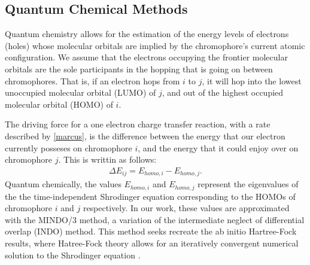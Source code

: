 \subsection{Quantum Chemical Methods}
\label{qccmethods}
Quantum chemistry allows for the estimation of the energy levels of electrons (holes) whose molecular orbitals are implied by the chromophore's current atomic configuration. 
We assume that the electrons occupying the frontier molecular orbitals are the sole participants in the
hopping that is going on between chromophores. That is, if an electron hops from $i$ to $j$, it will hop
into the lowest unoccupied molecular orbital (LUMO) of $j$, and out of the
highest occupied molecular orbital (HOMO) of $i$.  

The driving force for a one electron charge transfer reaction, 
with a rate described by \autoref{marcus}, is the difference between the energy that our electron 
currently posseses 
on chromophore $i$, and the energy that it could enjoy over on chromophore $j$. 
This is writtin as follows:
\begin{align}
    \Delta E_{ij} = E_{homo, i} - E_{homo, j}.
    \label{gibbs}
\end{align}
Quantum chemically, the values $E_{homo, i}$ and $E_{homo, j}$ represent the eigenvalues of the the
time-independent Shrodinger equation corresponding to the HOMOs of chromophore $i$ and $j$ respectively. 
In our work, these values are approximated with the MINDO/3 method, a variation of the intermediate neglect of 
differential overlap (INDO) method. This method seeks recreate the ab initio Hartree-Fock
results, where Hatree-Fock theory allows for an iteratively convergent numerical solution to the
Shrodinger equation \cite{Thiel2014}. 

